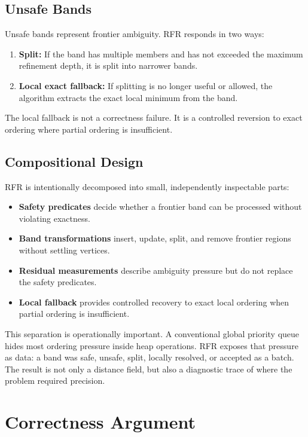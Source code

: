\documentclass[11pt]{article}
\newcommand{\RFR}{\textsc{RFR}}
\begin{document}
\subsection{Unsafe Bands}

Unsafe bands represent frontier ambiguity. \RFR{} responds in two ways:

\begin{enumerate}
  \item \textbf{Split:} If the band has multiple members and has not exceeded the maximum refinement depth, it is split into narrower bands.
  \item \textbf{Local exact fallback:} If splitting is no longer useful or allowed, the algorithm extracts the exact local minimum from the band.
\end{enumerate}

The local fallback is not a correctness failure. It is a controlled reversion to exact ordering where partial ordering is insufficient.

\subsection{Compositional Design}

\RFR{} is intentionally decomposed into small, independently inspectable parts:

\begin{itemize}
  \item \textbf{Safety predicates} decide whether a frontier band can be processed without violating exactness.
  \item \textbf{Band transformations} insert, update, split, and remove frontier regions without settling vertices.
  \item \textbf{Residual measurements} describe ambiguity pressure but do not replace the safety predicates.
  \item \textbf{Local fallback} provides controlled recovery to exact local ordering when partial ordering is insufficient.
\end{itemize}

This separation is operationally important. A conventional global priority queue hides most ordering pressure inside heap operations. \RFR{} exposes that pressure as data: a band was safe, unsafe, split, locally resolved, or accepted as a batch. The result is not only a distance field, but also a diagnostic trace of where the problem required precision.

\section{Correctness Argument}
\label{sec:correctness}
\end{document}
